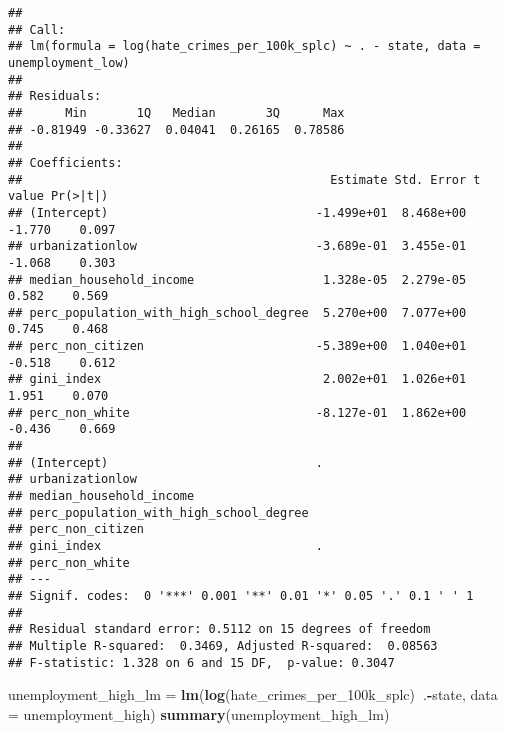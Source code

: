 \documentclass[
]{article}
\newenvironment{Shaded}{\begin{snugshade}}{\end{snugshade}}
\newcommand{\DataTypeTok}[1]{\textcolor[rgb]{0.13,0.29,0.53}{#1}}
\newcommand{\KeywordTok}[1]{\textcolor[rgb]{0.13,0.29,0.53}{\textbf{#1}}}
\newcommand{\NormalTok}[1]{#1}
\newcommand{\OperatorTok}[1]{\textcolor[rgb]{0.81,0.36,0.00}{\textbf{#1}}}
\newcommand{\StringTok}[1]{\textcolor[rgb]{0.31,0.60,0.02}{#1}}
\begin{document}
\begin{verbatim}
## 
## Call:
## lm(formula = log(hate_crimes_per_100k_splc) ~ . - state, data = unemployment_low)
## 
## Residuals:
##      Min       1Q   Median       3Q      Max 
## -0.81949 -0.33627  0.04041  0.26165  0.78586 
## 
## Coefficients:
##                                           Estimate Std. Error t value Pr(>|t|)
## (Intercept)                             -1.499e+01  8.468e+00  -1.770    0.097
## urbanizationlow                         -3.689e-01  3.455e-01  -1.068    0.303
## median_household_income                  1.328e-05  2.279e-05   0.582    0.569
## perc_population_with_high_school_degree  5.270e+00  7.077e+00   0.745    0.468
## perc_non_citizen                        -5.389e+00  1.040e+01  -0.518    0.612
## gini_index                               2.002e+01  1.026e+01   1.951    0.070
## perc_non_white                          -8.127e-01  1.862e+00  -0.436    0.669
##                                          
## (Intercept)                             .
## urbanizationlow                          
## median_household_income                  
## perc_population_with_high_school_degree  
## perc_non_citizen                         
## gini_index                              .
## perc_non_white                           
## ---
## Signif. codes:  0 '***' 0.001 '**' 0.01 '*' 0.05 '.' 0.1 ' ' 1
## 
## Residual standard error: 0.5112 on 15 degrees of freedom
## Multiple R-squared:  0.3469, Adjusted R-squared:  0.08563 
## F-statistic: 1.328 on 6 and 15 DF,  p-value: 0.3047
\end{verbatim}

\begin{Shaded}
\begin{Highlighting}[]
\NormalTok{unemployment_high_lm =}\StringTok{ }\KeywordTok{lm}\NormalTok{(}\KeywordTok{log}\NormalTok{(hate_crimes_per_100k_splc)}\OperatorTok{~}\NormalTok{.}\OperatorTok{-}\NormalTok{state, }\DataTypeTok{data =}\NormalTok{ unemployment_high)}
\KeywordTok{summary}\NormalTok{(unemployment_high_lm)}
\end{Highlighting}
\end{Shaded}
\end{document}
